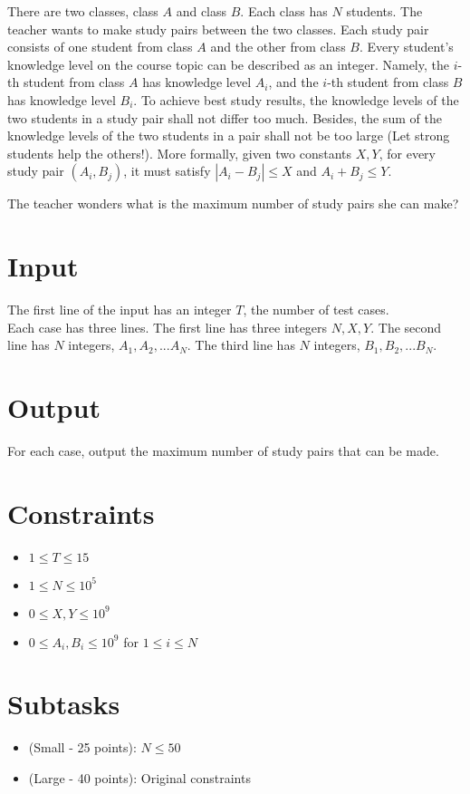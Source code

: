 
There are two classes, class $A$ and class $B$.
Each class has $N$ students.
The teacher wants to make study pairs between the two classes.
Each study pair consists of one student from class $A$ and the other from class $B$.
Every student's knowledge level on the course topic can be described as an integer.
Namely, the $i$-th student from class $A$ has knowledge level $A_i$, and the $i$-th student from class $B$ has knowledge level $B_i$.
To achieve best study results, the knowledge levels of the two students in a study pair shall not differ too much.
Besides, the sum of the knowledge levels of the two students in a pair shall not be too large (Let strong students help the others!).
More formally, given two constants $X, Y$, for every study pair $(A_i, B_j)$, it must satisfy $|A_i - B_j| \leq X$ and $A_i + B_j \leq Y$.


The teacher wonders what is the maximum number of study pairs she can make?


\section*{Input}

The first line of the input has an integer $T$, the number of test cases.\\
Each case has three lines.
The first line has three integers $N, X, Y$.
The second line has $N$ integers, $A_1, A_2, ... A_N$.
The third line has $N$ integers, $B_1, B_2, ... B_N$.

\section*{Output}

For each case, output the maximum number of study pairs that can be made.

\section*{Constraints}
\begin{itemize}
\item $1 \leq T\leq 15$
\item $1 \leq N \leq 10^5$
\item $0 \leq X, Y \leq 10^9$
\item $0 \leq A_i, B_i \leq 10^9$ for $1\leq i \leq N$
\end{itemize}

\section*{Subtasks}
\begin{itemize}
\item (Small - 25 points): $N \leq 50$
\item (Large - 40 points): Original constraints
\end{itemize}